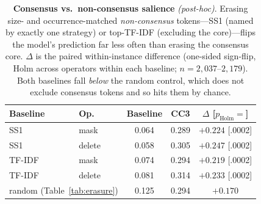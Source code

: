 \documentclass[11pt]{article}
\newcommand{\holm}[1]{$p_{\mathrm{Holm}}{=}#1$}
\begin{document}
\begin{table}[t]
\centering
\small
\setlength{\tabcolsep}{3.4pt}
\begin{tabular}{llccc}
\toprule
Baseline & Op. & Baseline & CC3 & $\Delta$ [\holm{}] \\
\midrule
SS1     & mask   & 0.064 & 0.289 & $+0.224$ [.0002] \\
SS1     & delete & 0.058 & 0.305 & $+0.247$ [.0002] \\
TF-IDF  & mask   & 0.074 & 0.294 & $+0.219$ [.0002] \\
TF-IDF  & delete & 0.081 & 0.314 & $+0.233$ [.0002] \\
\midrule
\multicolumn{2}{l}{random (Table~\ref{tab:erasure})} & 0.125 & 0.294 & $+0.170$ \\
\bottomrule
\end{tabular}
\caption{\textbf{Consensus vs.\ non-consensus salience} \emph{(post-hoc)}. Erasing size- and occurrence-matched \emph{non-consensus} tokens---SS1 (named by exactly one strategy) or top-TF-IDF (excluding the core)---flips the model's prediction far less often than erasing the consensus core. $\Delta$ is the paired within-instance difference (one-sided sign-flip, Holm across operators within each baseline; $n{=}2{,}037$--$2{,}179$). Both baselines fall \emph{below} the random control, which does not exclude consensus tokens and so hits them by chance.}
\label{tab:salience}
\end{table}
\end{document}
